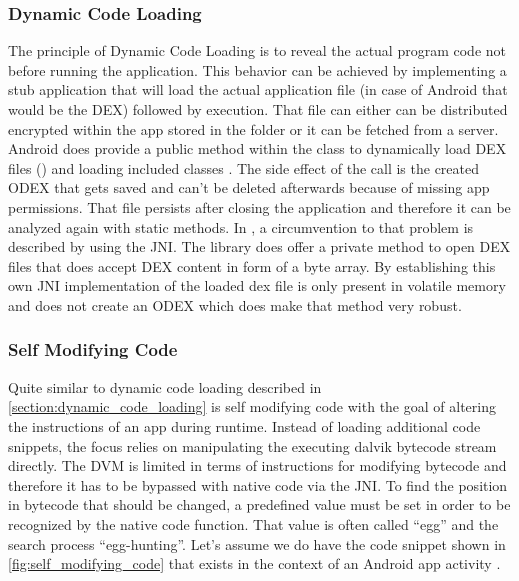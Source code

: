 \subsubsection{Dynamic Code Loading}\label{section:dynamic_code_loading}
The principle of Dynamic Code Loading is to reveal the actual program code
not before running the application. This behavior can be achieved by
implementing a stub application that will load the actual application file
(in case of Android that would be the DEX) followed by execution.
That file can either can be distributed encrypted within the app stored
in the  folder or it can be fetched from a server.
Android does provide a public method within
the  class to dynamically load DEX files
()
and loading included classes \parencite{dexfileclass}. The side effect
of the  call is the created ODEX that gets saved and
can't be deleted afterwards because of missing app permissions.
That file persists after closing the application and therefore
it can be analyzed again with static methods. In \parencite{code_protection},
a circumvention to that problem is described by using the JNI.
The  library does offer a private method to open DEX files
that does accept DEX content in form of a byte array.
By establishing this own JNI implementation of
 the loaded dex file is only present
in volatile memory and does not create an ODEX \parencite{code_protection}
which does make that method very robust.

\subsubsection{Self Modifying Code}
Quite similar to dynamic code loading described in
\autoref{section:dynamic_code_loading} is self modifying code with the goal
of altering the instructions of an app during runtime.
Instead of loading additional code snippets, the focus relies on
manipulating the executing dalvik bytecode stream directly.
The DVM is limited in terms of instructions for modifying bytecode
and therefore it has to be bypassed with native code via the JNI.
To find the position in bytecode that should be changed, a predefined
value must be set in order to be recognized by the native code function.
That value is often called ``egg'' and the search process ``egg-hunting''.
Let's assume we do have the code snippet shown in \autoref{fig:self_modifying_code} that exists in the context of an Android app activity
\parencite{code_protection}.

